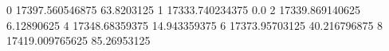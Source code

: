 0 17397.560546875 63.8203125
1 17333.740234375 0.0
2 17339.869140625 6.12890625
4 17348.68359375 14.943359375
6 17373.95703125 40.216796875
8 17419.009765625 85.26953125
